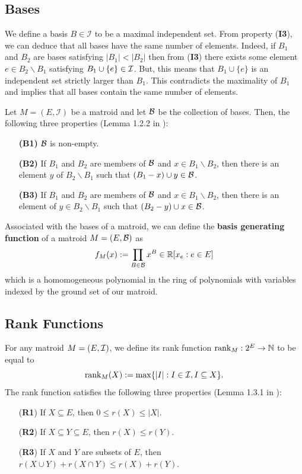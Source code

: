 \documentclass{puthesis-UG}
\begin{document}
\subsection{Bases}
We define a basis $B \in \mathcal{I}$ to be a maximal independent set. From property (\textbf{I3}), we can deduce that all bases have the same number of elements. Indeed, if $B_1$ and $B_2$ are bases satisfying $|B_1| < |B_2|$ then from (\textbf{I3}) there exists some element $e \in B_2 \backslash B_1$ satisfying $B_1 \cup \{e\} \in \mathcal{I}$. But, this means that $B_1 \cup \{e\}$ is an independent set strictly larger than $B_1$. This contradicts the maximality of $B_1$ and implies that all bases contain the same number of elements. 
\begin{defn}
	Let $M = (E, \mathcal{I})$ be a matroid and let $\mathcal{B}$ be the collection of bases. Then, the following three properties (Lemma 1.2.2 in \cite{10.5555/1197093}):
	\begin{enumerate}
		\item[\textbf{(B1)}] $\mathcal{B}$ is non-empty.
		\item[\textbf{(B2)}] If $B_1$ and $B_2$ are members of $\mathcal{B}$ and $x \in B_1 \backslash B_2$, then there is an element $y$ of $B_2 \backslash B_1$ such that $(B_1 - x) \cup y \in \mathcal{B}$. 
		\item[\textbf{(B3)}] If $B_1$ and $B_2$ are members of $\mathcal{B}$ and $x \in B_1 \backslash B_2$, then there is an element of $y \in B_2 \backslash B_1$ such that $(B_2 - y) \cup x \in \mathcal{B}$. 
	\end{enumerate}
\end{defn}

Associated with the bases of a matroid, we can define the \textbf{basis generating function} of a matroid $M = (E, \mathcal{B})$ as
\[
	f_M (x) := \prod_{B \in \mathcal{B}} x^B \in \mathbb{R}[x_e : e \in E]
\]
which is a homomogeneous polynomial in the ring of polynomials with variables indexed by the ground set of our matroid. 

\subsection{Rank Functions}

\begin{defn}
	For any matroid $M = (E, \mathcal{I})$, we define its rank function $\operatorname{rank}_M : 2^E \to \mathbb{N}$ to be equal to
	\[
		\operatorname{rank}_M(X) := \max \{|I| : I \in \mathcal{I}, I \subseteq X\}.
	\]
	The rank function satisfies the following three properties (Lemma 1.3.1 in \cite{10.5555/1197093}):
	\begin{enumerate}
		\item[(\textbf{R1})] If $X \subseteq E$, then $0 \leq r(X) \leq |X|$. 
		\item[(\textbf{R2})] If $X \subseteq Y \subseteq E$, then $r(X) \leq r(Y)$. 
		\item[(\textbf{R3})] If $X$ and $Y$ are subsets of $E$, then $r(X \cup Y) + r(X \cap Y) \leq r(X) + r(Y)$.
	\end{enumerate}
\end{defn}
\end{document}
